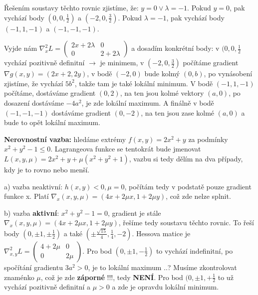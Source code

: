 \vspace{4pt}
\noindent Řešením soustavy těchto rovnic zjistíme, že: $y = 0 \lor \lambda = -1$. Pokud $y = 0$, pak vychází body $(0,0,\frac{1}{2})$ a $(-2,0,\frac{3}{2})$. Pokud $\lambda = -1$, pak vychází body $(-1,1,-1)$ a $(-1,-1,-1)$.

\vspace{4pt}
\noindent Vyjde nám $\nabla^2_x L = \begin{pmatrix}
    2x + 2\lambda & 0 \\
    0 & 2 + 2\lambda
\end{pmatrix}$ a dosadím konkrétní body: v $(0,0,\frac{1}{2}$ vychází pozitivně definitní $\to$ je minimem, v $(-2,0,\frac{3}{2})$ počítáme gradient $\nabla g(x,y) = (2x + 2, 2y)$, v bodě $(-2,0)$ bude kolmý $(0,b)$, po vynásobení zjistíme, že vychází $5b^2$, takže tam je také lokální minimum. V bodě $(-1,1,-1)$ počítáme, dostáváme gradient $(0,2)$, na ten jsou kolmé vektory $(a,0)$, po dosazení dostáváme $-4a^2$, je zde lokální maximum. A finálně v bodě $(-1,-1,-1)$ dostáváme gradient $(0,-2)$, na ten jsou zase kolmé $(a,0)$ a bude to opět lokální maximum.

\vspace{12pt}
\noindent \textbf{Nerovnostní vazba:} hledáme extrémy $f(x,y) = 2x^2 + y$ za podmínky $x^2 + y^2 - 1\leq 0$. Lagrangeova funkce se tentokrát bude jmenovat $L(x,y,\mu) = 2x^2 + y + \mu(x^2 + y^2 + 1)$, vazbu si tedy dělím na dva případy, kdy je to rovno nebo menší.

\vspace{4pt}
\noindent a) vazba neaktivní: $h(x,y) < 0, \mu = 0$, počítám tedy v podstatě pouze gradient funkce x. Platí $\nabla_x(x,y,\mu) = (4x + 2\mu{}x, 1 + 2\mu{}y)$, což zde nelze splnit.

\vspace{4pt}
\noindent b) vazba \textbf{aktivní}: $x^2 + y^2 - 1 = 0$, gradient je stále $\nabla_x(x,y,\mu) = (4x + 2\mu{}x, 1 + 2\mu{}y)$, řešíme tedy soustavu těchto rovnic. To řeší body $(0,\pm 1,\pm \frac{1}{2})$ a také $(\pm \frac{\sqrt{15}}{4}, \frac{1}{4}, -2)$. Hessova matice je $\nabla^2_{x,y} L = \begin{pmatrix}
    4 + 2\mu & 0 \\
    0 & 2\mu
\end{pmatrix}$. Pro bod $(0,\pm 1, - \frac{1}{2})$ to vychází indefinitní, po spočítání gradientu $3a^2 > 0$, je to lokální maximum ..? Musíme zkontrolovat znaménko $\mu$, což je zde \textbf{záporné} !!!, tedy \textbf{NENÍ}. Pro bod $(0, \pm 1, + \frac{1}{2}$ to už vychází pozitivně definitní a $\mu > 0$ a zde je opravdu lokální minimum.
